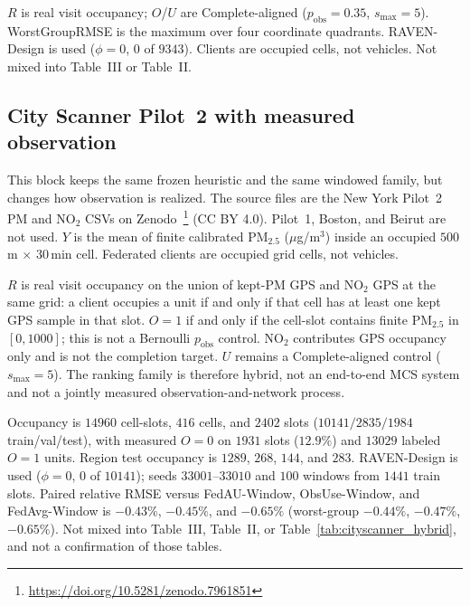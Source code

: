 \begin{table}[t]
\begin{minipage}{\columnwidth}
\raggedright\scriptsize
$R$ is real visit occupancy; $O$/$U$ are Complete-aligned
($p_{\mathrm{obs}}=0.35$, $s_{\max}=5$).
WorstGroupRMSE is the maximum over four coordinate quadrants.
RAVEN-Design is used ($\phi=0$, $0$ of $9343$).
Clients are occupied cells, not vehicles.
Not mixed into Table~III or
Table~II.
\end{minipage}
\end{table}

\subsection{City Scanner Pilot~2 with measured observation}
\label{app:cityscanner_p2_measured_o}

This block keeps the same frozen heuristic and the same windowed family, but
changes how observation is realized.
The source files are the New York Pilot~2 {PM} and {NO}$_2$ CSVs on
Zenodo~\footnote{\url{https://doi.org/10.5281/zenodo.7961851}}
({CC BY} 4.0).  Pilot~1, Boston, and Beirut are not used.
$Y$ is the mean of finite calibrated {PM}$_{2.5}$ ($\mu$g/m$^3$) inside
an occupied $500$\,m $\times$ $30$\,min cell.
Federated clients are occupied grid cells, not vehicles.

$R$ is real visit occupancy on the union of kept-{PM} GPS and {NO}$_2$ GPS
at the same grid: a client occupies a unit if and only if that cell has at
least one kept GPS sample in that slot.
$O=1$ if and only if the cell-slot contains finite {PM}$_{2.5}$ in
$[0,1000]$; this is not a Bernoulli $p_{\mathrm{obs}}$ control.
{NO}$_2$ contributes GPS occupancy only and is not the completion target.
$U$ remains a Complete-aligned control ($s_{\max}=5$).
The ranking family is therefore hybrid, not an end-to-end MCS system and
not a jointly measured observation-and-network process.

Occupancy is $14960$ cell-slots, $416$ cells, and $2402$ slots
($10141/2835/1984$ train/val/test), with measured $O=0$ on $1931$ slots
($12.9\%$) and $13029$ labeled $O=1$ units.
Region test occupancy is $1289$, $268$, $144$, and $283$.
RAVEN-Design is used ($\phi=0$, $0$ of $10141$); seeds $33001$--$33010$ and
$100$ windows from $1441$ train slots.
Paired relative RMSE versus FedAU-Window, ObsUse-Window, and FedAvg-Window is
$-0.43\%$, $-0.45\%$, and $-0.65\%$ (worst-group $-0.44\%$, $-0.47\%$,
$-0.65\%$).
Not mixed into Table~III,
Table~II, or Table~\ref{tab:cityscanner_hybrid},
and not a confirmation of those tables.

